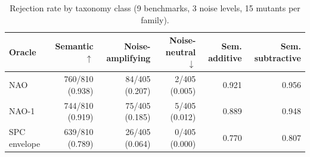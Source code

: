 \begin{table}[t]
\centering
\caption{Rejection rate by taxonomy class (9 benchmarks, 3 noise levels, 15 mutants per family).}
\label{tab:rq2-mutation}
\small
\begin{tabular}{lrrrrr}
\toprule
Oracle & Semantic $\uparrow$ & Noise-amplifying & Noise-neutral $\downarrow$ & Sem. additive & Sem. subtractive \\
\midrule
NAO & 760/810 (0.938) & 84/405 (0.207) & 2/405 (0.005) & 0.921 & 0.956 \\
NAO-1 & 744/810 (0.919) & 75/405 (0.185) & 5/405 (0.012) & 0.889 & 0.948 \\
SPC envelope & 639/810 (0.789) & 26/405 (0.064) & 0/405 (0.000) & 0.770 & 0.807 \\
\bottomrule
\end{tabular}
\end{table}
